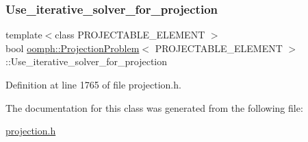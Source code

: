 \subsubsection{\texorpdfstring{Use\+\_\+iterative\+\_\+solver\+\_\+for\+\_\+projection}{Use\_iterative\_solver\_for\_projection}}
{\footnotesize\ttfamily template$<$class P\+R\+O\+J\+E\+C\+T\+A\+B\+L\+E\+\_\+\+E\+L\+E\+M\+E\+NT $>$ \\
bool \hyperlink{classoomph_1_1ProjectionProblem}{oomph\+::\+Projection\+Problem}$<$ P\+R\+O\+J\+E\+C\+T\+A\+B\+L\+E\+\_\+\+E\+L\+E\+M\+E\+NT $>$\+::Use\+\_\+iterative\+\_\+solver\+\_\+for\+\_\+projection\hspace{0.3cm}{\ttfamily [private]}}



Definition at line 1765 of file projection.\+h.



The documentation for this class was generated from the following file\+:\begin{DoxyCompactItemize}
\item 
\hyperlink{projection_8h}{projection.\+h}\end{DoxyCompactItemize}
